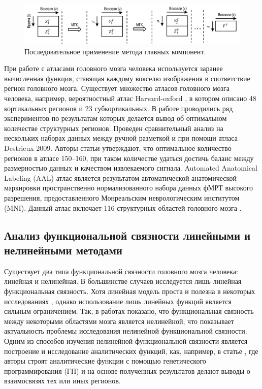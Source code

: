 \begin{figure}[ht]
    \centering
    \includegraphics[width=1.0\linewidth]{images/group_pca.pdf}
    \caption{Последовательное применение метода главных компонент.}\label{fig:group_pca}
\end{figure}

При работе с атласами головного мозга человека используется заранее вычисленная функция, ставящая каждому вокселю изображения в соответствие регион головного мозга. Существует множество атласов головного мозга человека, например, вероятностный атлас Harvard-oxford \cite{desikan2006automated}, в котором описано 48 кортикальных регионов и 23 субкортикальных. В работе \cite{fischl2004automatically} проводились ряд экспериментов по результатам которых делается вывод об оптимальном количестве структурных регионов. Проведен сравнительный анализ на нескольких наборах данных между ручной разметкой и при помощи атласа Destrieux 2009. Авторы статьи утверждают, что оптимальное количество регионов в атласе 150–160, при таком количестве удаться достичь баланс между размерностью данных и качеством извлекаемого сигнала. Automated Anatomical Labeling (AAL) атлас является результатом автоматической анатомической маркировки пространственно нормализованного набора данных фМРТ высокого разрешения, предоставленного Монреальским неврологическим институтом (MNI). Данный атлас включает 116 структурных областей головного мозга \cite{tzourio2002automated}.

 
\subsection{Анализ функциональной связности линейными и нелинейными методами}
Существует два типа функциональной связности головного мозга человека: линейная и нелинейная. В большинстве случаев исследуется лишь линейная функциональная связность. Хотя линейная модель проста и полезна в некоторых исследованиях \cite{soch2017improve, eklund2017bayesian, kovalev2017search}, однако использование лишь линейных функций является сильным ограничением. Так, в работах \cite{lahaye2003functional, karanikolas2016multi} показано, что функциональная связность между некоторыми областями мозга является нелинейной, что показывает актуальность проблемы исследования нелинейной функциональной связности. Одним из способов изучения нелинейной функциональной связности является построение и исследование аналитических функций, как, например, в статье \cite{allgaier2015nonlinear}, где авторы строят аналитические функции с помощью генетического программирования (ГП) и на основе полученных результатов делают выводы о взаимосвязях тех или иных регионов.


